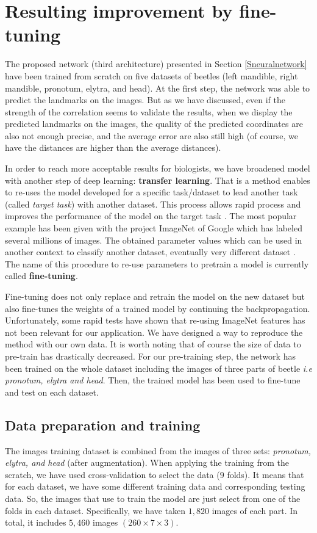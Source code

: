 \documentclass[review]{elsarticle}
\begin{document}
\section{Resulting improvement by fine-tuning}
\label{sfineTuning}
The proposed network (third architecture) presented in Section \ref{Sneuralnetwork} have been trained from scratch on five datasets of beetles (left mandible, right mandible, pronotum, elytra, and head). At the first step, the network was able to predict the landmarks on the images. But as we have discussed, even if the strength of the correlation seems to validate the results, when we display the predicted landmarks on the images, the quality of the predicted coordinates are also not enough precise, and the average error are also still high (of course, we have the distances are higher than the average distances).

In order to reach more acceptable results for biologists, we have broadened model with another step of deep learning: \textbf{transfer learning}. That is a method enables to re-uses the model developed for a specific task/dataset to lead another task (called \textit{target task}) with another dataset. This process allows rapid process and improves the performance of the model on the target task \cite{torrey2009transfer}. The most popular example has been given with the project ImageNet of Google \cite{imagenet_cvpr09} which has labeled several millions of images. The obtained parameter values which can be used in another context to classify another dataset, eventually very different dataset \cite{margeta_mri}. The name of this procedure to re-use parameters to pretrain a model is currently called \textbf{fine-tuning}.

Fine-tuning does not only replace and retrain the model on
the new dataset but also fine-tunes the weights of a trained
model by continuing the backpropagation. Unfortunately,
some rapid tests have shown that re-using ImageNet features
has not been relevant for our application. We have designed a
way to reproduce the method with our own data. It is worth
noting that of course the size of data to pre-train has drastically decreased. For our pre-training step, the network has been
trained on the whole dataset including the images of three parts
of beetle \textit{i.e pronotum, elytra and head}. Then, the trained model
has been used to fine-tune and test on each dataset.
\subsection{Data preparation and training}
The images training dataset is combined from the images of three sets: \textit{pronotum, elytra, and head} (after augmentation). When applying the training from the scratch, we have used cross-validation to select the data ($9$ folds). It means that for each dataset, we have some different training data and corresponding testing data. So, the images that use to train the model are just select from one of the folds in each dataset. Specifically, we have taken $1, 820$ images of each part. In total, it includes $5, 460$ images $(260 \times 7 \times 3)$. 
\end{document}
